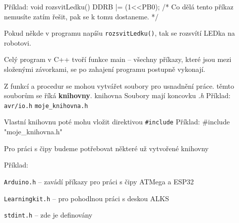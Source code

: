 Příklad:
 \begtt 
void rozsvitLedku()
{
  DDRB |= (1<<PB0); /* Co dělá tento příkaz nemusíte zatím řešit,
   pak se k tomu dostaneme.
   */
}
\endtt

Pokud někde v programu napíšu { \tt  rozsvitLedku()}, tak se rozsvítí LEDka na robotovi.

Celý program v C++ tvoří funkce \iid main -- všechny příkazy, které jsou mezi složenými závorkami, se po zahajení programu postupně vykonají. 


Z funkcí a procedur se mohou vytvářet soubory pro usnadnění práce. těmto souborům se říká {\bf knihovny}. \ii knihovna Soubory mají koncovku {\it .h}
Příklad: { \tt  avr/io.h}
{ \tt  moje\_knihovna.h}

Vlastní knihovnu poté mohu vložit direktivou { \tt  \#include}
Příklad:
 \begtt 
#include "moje_knihovna.h"
\endtt 


Pro práci s čipy budeme potřebovat některé už vytvořené knihovny

Příklad: 



{ \tt  Arduino.h} -- zavádí příkazy pro práci s čipy ATMega a ESP32

{ \tt  Learningkit.h}  -- pro pohodlnou práci s deskou ALKS

{ \tt  stdint.h}  -- zde je definovány \Black   

 
